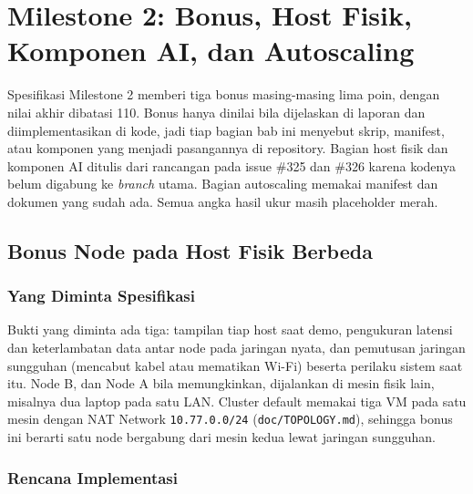 \chapter[MILESTONE 2: BONUS]{Milestone 2: Bonus, Host Fisik, Komponen AI, dan Autoscaling}

Spesifikasi Milestone 2 memberi tiga bonus masing-masing lima poin, dengan nilai akhir dibatasi 110. Bonus hanya dinilai bila dijelaskan di laporan dan diimplementasikan di kode, jadi tiap bagian bab ini menyebut skrip, manifest, atau komponen yang menjadi pasangannya di repository. Bagian host fisik dan komponen AI ditulis dari rancangan pada issue \#325 dan \#326 karena kodenya belum digabung ke \textit{branch} utama. Bagian autoscaling memakai manifest dan dokumen yang sudah ada. Semua angka hasil ukur masih placeholder merah.

\section{Bonus Node pada Host Fisik Berbeda}\label{sec:bonus-fisik}

\subsection{Yang Diminta Spesifikasi}

Bukti yang diminta ada tiga: tampilan tiap host saat demo, pengukuran latensi dan keterlambatan data antar node pada jaringan nyata, dan pemutusan jaringan sungguhan (mencabut kabel atau mematikan Wi-Fi) beserta perilaku sistem saat itu. Node B, dan Node A bila memungkinkan, dijalankan di mesin fisik lain, misalnya dua laptop pada satu LAN. Cluster default memakai tiga VM pada satu mesin dengan NAT Network \texttt{10.77.0.0/24} (\texttt{doc/TOPOLOGY.md}), sehingga bonus ini berarti satu node bergabung dari mesin kedua lewat jaringan sungguhan.

\subsection{Rencana Implementasi}

